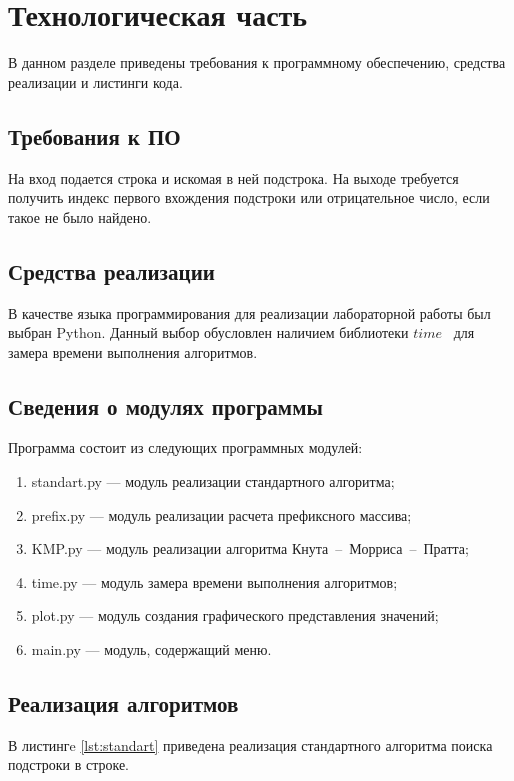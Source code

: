 \section{Технологическая часть}
В данном разделе приведены требования к программному обеспечению, средства реализации и листинги кода.

\subsection{Требования к ПО}
На вход подается строка и искомая в ней подстрока.
На выходе требуется получить индекс первого вхождения подстроки или отрицательное число, если такое не было найдено.

\subsection{Средства реализации}

В качестве языка программирования для реализации лабораторной работы был выбран Python.
Данный выбор обусловлен наличием библиотеки $time$~\cite{time} для замера времени выполнения алгоритмов.

\subsection{Сведения о модулях программы}
Программа состоит из следующих программных модулей:
\begin{enumerate}[label={\arabic*)}]
	\item standart.py --- модуль реализации стандартного алгоритма;
	\item prefix.py --- модуль реализации расчета префиксного массива;
	\item KMP.py --- модуль реализации алгоритма Кнута~--~Морриса~--~Пратта;
	\item time.py --- модуль замера времени выполнения алгоритмов;
	\item plot.py --- модуль создания графического представления значений;
	\item main.py --- модуль, содержащий меню.
\end{enumerate}

\newpage
\subsection{Реализация алгоритмов}

В листингe \ref{lst:standart} приведена реализация стандартного алгоритма поиска подстроки в строке.


